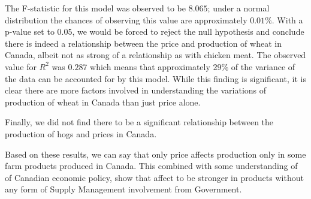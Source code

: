 The F-statistic for this model was observed to be $8.065$; under a normal distribution the chances of observing this value are approximately $0.01\%$.
With a p-value set to $0.05$, we would be forced to reject the null hypothesis and conclude there is indeed a relationship between the price and production of wheat in Canada, albeit not as strong of a relationship as with chicken meat.
The observed value for $R^2$ was $0.287$ which means that approximately 29\% of the variance of the data can be accounted for by this model.
While this finding is significant, it is clear there are more factors involved in understanding the variations of production of wheat in Canada than just price alone.

Finally, we did not find there to be a significant relationship between the production of hogs and prices in Canada.

Based on these results, we can say that only price affects production only in some farm products produced in Canada. This combined with some understanding of of Canadian economic policy, show that affect to be stronger in products without any form of Supply Management involvement from Government. 

